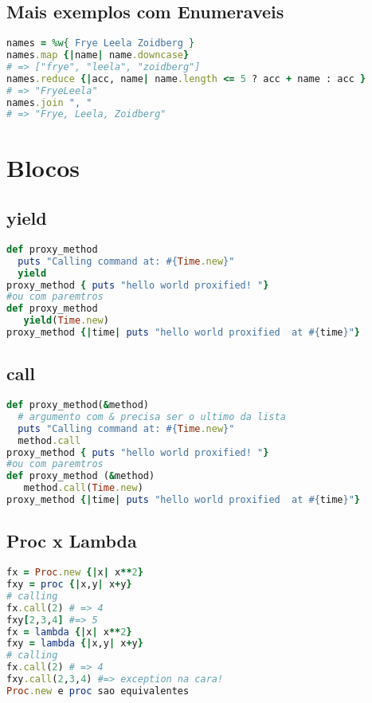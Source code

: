 \documentclass[serif,mathserif]{article}
\begin{document}
\subsection{Mais exemplos com Enumeraveis}
\begin{lstlisting}[language=ruby]
names = %w{ Frye Leela Zoidberg }
names.map {|name| name.downcase}
# => ["frye", "leela", "zoidberg"]
names.reduce {|acc, name| name.length <= 5 ? acc + name : acc }
# => "FryeLeela"
names.join ", "
# => "Frye, Leela, Zoidberg"
\end{lstlisting}


\section{Blocos}

\subsection{yield}
\begin{lstlisting}[language=ruby]
def proxy_method
  puts "Calling command at: #{Time.new}"
  yield
proxy_method { puts "hello world proxified! "}
#ou com paremtros
def proxy_method
   yield(Time.new)
proxy_method {|time| puts "hello world proxified  at #{time}"}
\end{lstlisting}

\subsection{call}
\begin{lstlisting}[language=ruby]
def proxy_method(&method)
  # argumento com & precisa ser o ultimo da lista
  puts "Calling command at: #{Time.new}"
  method.call
proxy_method { puts "hello world proxified! "}
#ou com paremtros
def proxy_method (&method)
   method.call(Time.new)
proxy_method {|time| puts "hello world proxified  at #{time}"}
\end{lstlisting}

\subsection{Proc x Lambda}
\begin{lstlisting}[language=ruby]
fx = Proc.new {|x| x**2}
fxy = proc {|x,y| x+y}
# calling
fx.call(2) # => 4
fxy[2,3,4] #=> 5
fx = lambda {|x| x**2}
fxy = lambda {|x,y| x+y}
# calling
fx.call(2) # => 4
fxy.call(2,3,4) #=> exception na cara!
Proc.new e proc sao equivalentes
\end{lstlisting}
\end{document}
